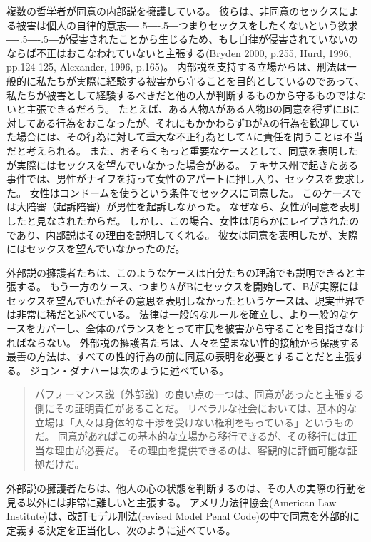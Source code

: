 \documentclass[paper=a4,book,openany]{jlreq}
\def\DDASH{―\kern-.5\zw―\kern-.5\zw―}
\begin{document}
複数の哲学者が同意の内部説を擁護している。
彼らは、非同意のセックスによる被害は個人の自律的意志{\DDASH}つまりセックスをしたくないという欲求{\DDASH}が侵害されたことから生じるため、もし自律が侵害されていないのならば不正はおこなわれていないと主張する(Bryden 2000, p.255, Hurd, 1996, pp.124-125, Alexander, 1996, p.165)。
\nocite{bryden00:_redef_rape}\nocite{hurd96:_moral_magic_consen}\nocite{alexander96:_moral_magic_consen_ii}
内部説を支持する立場からは、刑法は一般的に私たちが実際に経験する被害から守ることを目的としているのであって、私たちが被害として経験するべきだと他の人が判断するものから守るものではないと主張できるだろう。
たとえば、ある人物Aがある人物Bの同意を得ずにBに対してある行為をおこなったが、それにもかかわらずBがAの行為を歓迎していた場合には、その行為に対して重大な不正行為としてAに責任を問うことは不当だと考えられる。
また、おそらくもっと重要なケースとして、同意を表明したが実際にはセックスを望んでいなかった場合がある。
テキサス州で起きたある事件では、男性がナイフを持って女性のアパートに押し入り、セックスを要求した。
女性はコンドームを使うという条件でセックスに同意した。
このケースでは大陪審（起訴陪審）が男性を起訴しなかった。
なぜなら、女性が同意を表明したと見なされたからだ。
しかし、この場合、女性は明らかにレイプされたのであり、内部説はその理由を説明してくれる。
彼女は同意を表明したが、実際にはセックスを望んでいなかったのだ\citep[cf.][p.137]{hurd96:_moral_magic_consen}。

外部説の擁護者たちは、このようなケースは自分たちの理論でも説明できると主張する。
もう一方のケース、つまりAがBにセックスを開始して、Bが実際にはセックスを望んでいたがその意思を表明しなかったというケースは、現実世界では非常に稀だと述べている。
法律は一般的なルールを確立し、より一般的なケースをカバーし、全体のバランスをとって市民を被害から守ることを目指さなければならない。
外部説の擁護者たちは、人々を望まない性的接触から保護する最善の方法は、すべての性的行為の前に同意の表明を必要とすることだと主張する。
ジョン・ダナハーは次のように述べている。

\begin{quote}
  パフォーマンス説〔外部説〕の良い点の一つは、同意があったと主張する側にその証明責任があることだ。
リベラルな社会においては、基本的な立場は「人々は身体的な干渉を受けない権利をもっている」というものだ。
同意があればこの基本的な立場から移行できるが、その移行には正当な理由が必要だ。
その理由を提供できるのは、客観的に評価可能な証拠だけだ。
\citep{danaher13:_some_notes_consen_sexual_offen_part_one}
\end{quote}

外部説の擁護者たちは、他人の心の状態を判断するのは、その人の実際の行動を見る以外には非常に難しいと主張する。
アメリカ法律協会(American Law Institute)は、改訂モデル刑法(revised Model Penal Code)の中で同意を外部的に定義する決定を正当化し、次のように述べている。
\end{document}
